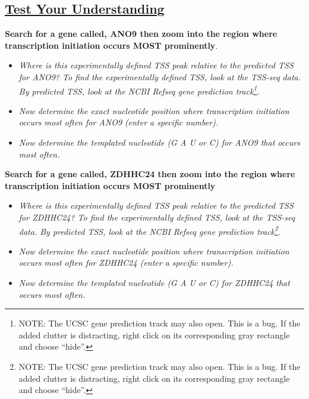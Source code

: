 \documentclass[
]{book}
\providecommand{\tightlist}{%
  \setlength{\itemsep}{0pt}\setlength{\parskip}{0pt}}
\begin{document}
\hypertarget{test-your-understanding-14}{%
\subsection{\texorpdfstring{\href{https://docs.google.com/forms/d/e/1FAIpQLSewgrAT0bWLa87TPlI-dcFIbXBKRn0yrZw9ELWU6JgWWg9V_g/viewform?usp=sf_link}{Test Your Understanding}}{Test Your Understanding}}\label{test-your-understanding-14}}

\textbf{Search for a gene called, ANO9 then zoom into the region where transcription initiation occurs MOST prominently}.

\begin{itemize}
\tightlist
\item
  \emph{Where is this experimentally defined TSS peak relative to the predicted TSS for ANO9? To find the experimentally defined TSS, look at the TSS-seq data. By predicted TSS, look at the NCBI Refseq gene prediction track\footnote{NOTE: The UCSC gene prediction track may also open. This is a bug. If the added clutter is distracting, right click on its corresponding gray rectangle and choose ``hide''.}.}
\item
  \emph{Now determine the exact nucleotide position where transcription initiation occurs most often for ANO9 (enter a specific number).}
\item
  \emph{Now determine the templated nucleotide (G A U or C) for ANO9 that occurs most often.}
\end{itemize}

\textbf{Search for a gene called, ZDHHC24 then zoom into the region where transcription initiation occurs MOST prominently}

\begin{itemize}
\tightlist
\item
  \emph{Where is this experimentally defined TSS peak relative to the predicted TSS for ZDHHC24? To find the experimentally defined TSS, look at the TSS-seq data. By predicted TSS, look at the NCBI Refseq gene prediction track\footnote{NOTE: The UCSC gene prediction track may also open. This is a bug. If the added clutter is distracting, right click on its corresponding gray rectangle and choose ``hide''.}.}
\item
  \emph{Now determine the exact nucleotide position where transcription initiation occurs most often for ZDHHC24 (enter a specific number).}
\item
  \emph{Now determine the templated nucleotide (G A U or C) for ZDHHC24 that occurs most often.}
\end{itemize}
\end{document}
